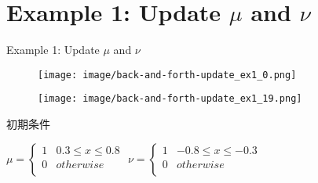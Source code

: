 \documentclass[aspectratio=169, dvipdfmx, 12pt]{beamer}
\begin{document}
\section{Example 1: Update $\mu$ and $\nu$}
\begin{frame}{Example 1: Update $\mu$ and $\nu$}
    \begin{figure}[htb]
        \begin{center}
            \begin{minipage}{0.45\hsize}
                \texttt{[image: image/back-and-forth-update\_ex1\_0.png]}
            \end{minipage}
            \begin{minipage}{0.45\hsize}
                \texttt{[image: image/back-and-forth-update\_ex1\_19.png]}
            \end{minipage}
        \end{center}
    \end{figure}
    \label{Example 1}

    初期条件
    \begin{center}
    $\mu = \left\{
        \begin{array}{ll}
            1 & 0.3 \le x \le 0.8 \\
            0 & otherwise \\
        \end{array}
    \right.
    $
    $\nu = \left\{
        \begin{array}{ll}
            1 & - 0.8 \le x \le - 0.3 \\
            0 & otherwise \\
        \end{array}
    \right.
    $
    \end{center}

\end{frame}

\end{document}

